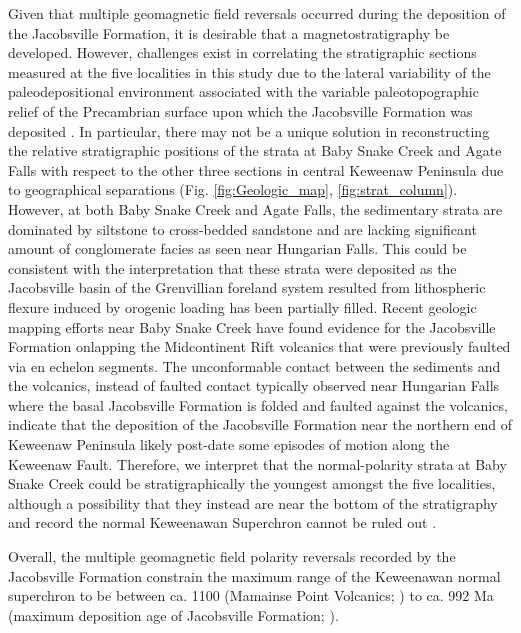 \documentclass[draft]{agujournal2019}
\begin{document}
Given that multiple geomagnetic field reversals occurred during the deposition of the Jacobsville Formation, it is desirable that a magnetostratigraphy be developed. However, challenges exist in correlating the stratigraphic sections measured at the five localities in this study due to the lateral variability of the paleodepositional environment associated with the variable paleotopographic relief of the Precambrian surface upon which the Jacobsville Formation was deposited \cite{Hamblin1958a, Kalliokoski1982a}. In particular, there may not be a unique solution in reconstructing the relative stratigraphic positions of the strata at Baby Snake Creek and Agate Falls with respect to the other three sections in central Keweenaw Peninsula due to geographical separations (Fig. \ref{fig:Geologic_map}, \ref{fig:strat_column}). However, at both Baby Snake Creek and Agate Falls, the sedimentary strata are dominated by siltstone to cross-bedded sandstone and are lacking significant amount of conglomerate facies as seen near Hungarian Falls. This could be consistent with the interpretation that these strata were deposited as the Jacobsville basin of the Grenvillian foreland system resulted from lithospheric flexure induced by orogenic loading has been partially filled. Recent geologic mapping efforts near Baby Snake Creek have found evidence for the Jacobsville Formation onlapping the Midcontinent Rift volcanics that were previously faulted via en echelon segments\cite{Tyrrell2019a, Mueller2021a}. The unconformable contact between the sediments and the volcanics, instead of faulted contact typically observed near Hungarian Falls where the basal Jacobsville Formation is folded and faulted against the volcanics, indicate that the deposition of the Jacobsville Formation near the northern end of Keweenaw Peninsula likely post-date some episodes of motion along the Keweenaw Fault. Therefore, we interpret that the normal-polarity strata at Baby Snake Creek could be stratigraphically the youngest amongst the five localities, although a possibility that they instead are near the bottom of the stratigraphy and record the normal Keweenawan Superchron cannot be ruled out \cite{Driscoll2016b}. 

Overall, the multiple geomagnetic field polarity reversals recorded by the Jacobsville Formation constrain the maximum range of the Keweenawan normal superchron \cite{Driscoll2016b} to be between ca. 1100 (Mamainse Point Volcanics; \cite{Swanson-Hysell2019a}) to ca. 992 Ma (maximum deposition age of Jacobsville Formation; \cite{Hodgin2022a}). 
\end{document}
